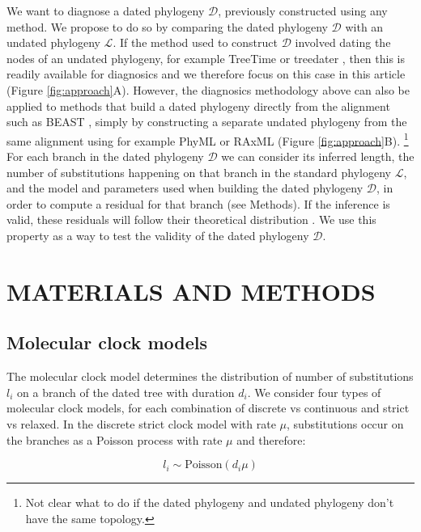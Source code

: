 \documentclass{article}
\begin{document}
We want to diagnose a dated phylogeny $\mathcal{D}$, previously constructed using
any method. We propose to do so by comparing the dated phylogeny $\mathcal{D}$ with 
an undated phylogeny $\mathcal{L}$. 
If the method used to construct $\mathcal{D}$ involved dating the nodes of an undated
phylogeny, for example TreeTime \citep{Sagulenko2018} or treedater \citep{Volz2017}, 
then this is readily available for diagnosics and we therefore focus on this case in this article
(Figure \ref{fig:approach}A). However, the diagnosics methodology
above can also be applied to methods that build a dated phylogeny directly from the alignment
such as BEAST \citep{Suchard2018},
simply by constructing a separate undated phylogeny from the same alignment using
for example PhyML \citep{Guindon2010} or RAxML \citep{Stamatakis2015} 
(Figure \ref{fig:approach}B). 
\footnote{Not clear what to do if the dated phylogeny and undated phylogeny don't have the same topology.}
For each branch in the dated phylogeny $\mathcal{D}$ we can
consider its inferred length, the number of substitutions happening on that branch in the standard phylogeny
$\mathcal{L}$, and the model and parameters used when building the dated phylogeny $\mathcal{D}$,
in order to compute a residual for that branch (see Methods). If the inference is valid,
these residuals will follow their theoretical distribution
\citep{coxGeneralDefinitionResiduals1968,dunnRandomizedQuantileResiduals1996}. 
We use this property as a way to test the validity of the dated phylogeny $\mathcal{D}$.

\section*{MATERIALS AND METHODS}

\subsection*{Molecular clock models}

The molecular clock model determines the distribution of number of substitutions $l_i$ on a branch of the dated
tree with duration $d_i$. We consider four types of molecular clock models, for each combination of discrete
vs continuous and strict vs relaxed. In the discrete strict clock
model \citep{Zuckerkandl1962} with rate $\mu$,
substitutions occur on the branches as a Poisson process with rate $\mu$ and therefore:

\begin{equation}
l_i \sim \mathrm{Poisson}(d_i \mu)
\label{eq:sc}
\end{equation}
\end{document}
